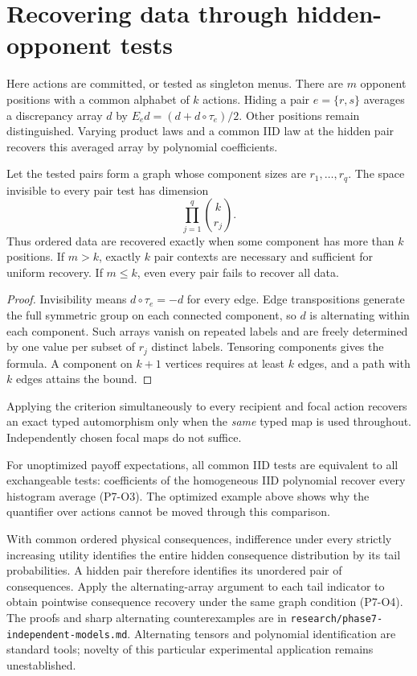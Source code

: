 \section{Recovering data through hidden-opponent tests}
Here actions are committed, or tested as singleton menus. There are $m$
opponent positions with a common alphabet of $k$ actions. Hiding a pair
$e=\{r,s\}$ averages a discrepancy array $d$ by
$E_e d=(d+d\circ\tau_e)/2$. Other positions remain distinguished.
Varying product laws and a common IID law at the hidden pair recovers this
averaged array by polynomial coefficients.

\begin{theorem}
Let the tested pairs form a graph whose component sizes are $r_1,\ldots,r_q$.
The space invisible to every pair test has dimension
\[
 \prod_{j=1}^q\binom{k}{r_j}.
\]
Thus ordered data are recovered exactly when some component has more than
$k$ positions. If $m>k$, exactly $k$ pair contexts are necessary and sufficient
for uniform recovery. If $m\le k$, even every pair fails to recover all data.
\end{theorem}
\begin{proof}
Invisibility means $d\circ\tau_e=-d$ for every edge. Edge transpositions
generate the full symmetric group on each connected component, so $d$ is
alternating within each component. Such arrays vanish on repeated labels
and are freely determined by one value per subset of $r_j$ distinct labels.
Tensoring components gives the formula. A component on $k+1$ vertices
requires at least $k$ edges, and a path with $k$ edges attains the bound.
\end{proof}
Applying the criterion simultaneously to every recipient and focal action
recovers an exact typed automorphism only when the \emph{same} typed map is
used throughout. Independently chosen focal maps do not suffice.

For unoptimized payoff expectations, all common IID tests are equivalent to
all exchangeable tests: coefficients of the homogeneous IID polynomial
recover every histogram average (P7-O3). The optimized example above shows
why the quantifier over actions cannot be moved through this comparison.

With common ordered physical consequences, indifference under every strictly
increasing utility identifies the entire hidden consequence distribution by
its tail probabilities. A hidden pair therefore identifies its unordered
pair of consequences. Apply the alternating-array argument to each tail
indicator to obtain pointwise consequence recovery under the same graph
condition (P7-O4). The proofs and sharp alternating counterexamples are in
\texttt{research/phase7-independent-models.md}. Alternating tensors and
polynomial identification are standard tools; novelty of this particular
experimental application remains unestablished.
